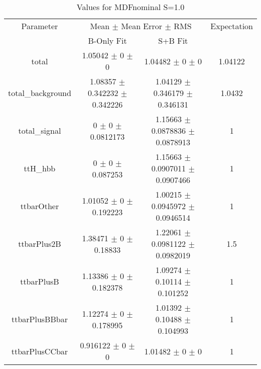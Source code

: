 \begin{table}
\centering
\caption{Values for MDFnominal S=1.0}
\begin{tabular}{cccc}
\toprule
Parameter & \multicolumn{2}{c}{Mean $\pm$ Mean Error $\pm$ RMS} & Expectation\\
 & B-Only Fit & S+B Fit & \\
\midrule
total & \num{1.05042} $\pm$ \num{0} $\pm$ \num{0} & \num{1.04482} $\pm$ \num{0} $\pm$ \num{0} & \num{1.04122}\\
total\_background & \num{1.08357} $\pm$ \num{0.342232} $\pm$ \num{0.342226} & \num{1.04129} $\pm$ \num{0.346179} $\pm$ \num{0.346131} & \num{1.0432}\\
total\_signal & \num{0} $\pm$ \num{0} $\pm$ \num{0.0812173} & \num{1.15663} $\pm$ \num{0.0878836} $\pm$ \num{0.0878913} & \num{1}\\
ttH\_hbb & \num{0} $\pm$ \num{0} $\pm$ \num{0.087253} & \num{1.15663} $\pm$ \num{0.0907011} $\pm$ \num{0.0907466} & \num{1}\\
ttbarOther & \num{1.01052} $\pm$ \num{0} $\pm$ \num{0.192223} & \num{1.00215} $\pm$ \num{0.0945972} $\pm$ \num{0.0946514} & \num{1}\\
ttbarPlus2B & \num{1.38471} $\pm$ \num{0} $\pm$ \num{0.18833} & \num{1.22061} $\pm$ \num{0.0981122} $\pm$ \num{0.0982019} & \num{1.5}\\
ttbarPlusB & \num{1.13386} $\pm$ \num{0} $\pm$ \num{0.182378} & \num{1.09274} $\pm$ \num{0.10114} $\pm$ \num{0.101252} & \num{1}\\
ttbarPlusBBbar & \num{1.12274} $\pm$ \num{0} $\pm$ \num{0.178995} & \num{1.01392} $\pm$ \num{0.10488} $\pm$ \num{0.104993} & \num{1}\\
ttbarPlusCCbar & \num{0.916122} $\pm$ \num{0} $\pm$ \num{0} & \num{1.01482} $\pm$ \num{0} $\pm$ \num{0} & \num{1}\\
\bottomrule
\end{tabular}
\end{table}